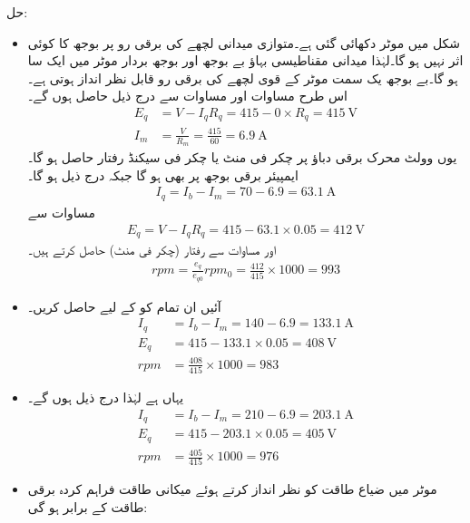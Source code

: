 حل:
\begin{itemize}
\item
شکل  میں موٹر دکھائی گئی ہے۔متوازی میدانی لچھے کی  برقی رو پر بوجھ کا کوئی اثر نہیں ہو گا۔لہٰذا میدانی مقناطیسی بہاؤ بے بوجھ اور بوجھ بردار موٹر میں ایک سا  ہو گا۔بے بوجھ یک سمت  موٹر کے قوی لچھے کی برقی رو   قابل نظر انداز ہوتی  ہے۔اس طرح مساوات   اور مساوات   سے  درج ذیل حاصل ہوں گے۔
\begin{align*}
E_q&=V-I_q R_q=415-0\times R_q=\SI{415}{\volt}\\
I_m&=\frac{V}{R_m}=\frac{415}{60}= \SI{6.9}{\ampere}
\end{align*}
یوں  وولٹ محرک برقی دباؤ پر   چکر فی منٹ یا  چکر فی سیکنڈ رفتار حاصل ہو گا۔ ایمپیئر برقی بوجھ پر بھی  ہو گا جبکہ   درج ذیل ہو گا۔
\begin{align*}
I_q=I_b-I_m=70-6.9= \SI{63.1}{\ampere}
\end{align*}
 مساوات   سے 
\begin{align*}
E_q=V-I_q R_q=415-63.1 \times 0.05=\SI{412}{\volt}
\end{align*}
اور مساوات   سے رفتار (چکر فی منٹ) حاصل کرتے ہیں۔
\begin{align*}
rpm=\frac{e_q}{e_{q0}} rpm_0=\frac{412}{415} \times 1000=993
\end{align*}
%
\item
آئیں ان تمام کو   کے لیے حاصل کریں۔
\begin{align*}
I_q&=I_b-I_m=140-6.9=\SI{133.1}{\ampere}\\
E_q&=415-133.1 \times 0.05=\SI{408}{\volt}\\
rpm&=\frac{408}{415} \times 1000=983
\end{align*}
%
\item
یہاں  ہے لہٰذا درج ذیل ہوں گے۔
\begin{align*}
I_q&=I_b-I_m=210-6.9=\SI{203.1}{\ampere}\\
E_q&=415-203.1 \times 0.05=\SI{405}{\volt}\\
rpm&=\frac{405}{415} \times 1000=976
\end{align*}
%
\item
موٹر میں ضیاع طاقت  کو نظر انداز کرتے ہوئے میکانی طاقت فراہم کردہ برقی طاقت کے برابر ہو گی:
\begin{align}

\end{align}
\end{itemize}
